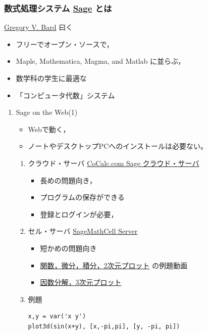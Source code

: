 \documentclass[dvipdfmx,11pat]{jarticle}
\begin{document}
\subsubsection{数式処理システム \href{http://www.sagemath.org}{Sage} とは}
\label{sec:orgf4ed4fb}
\href{http://www.gregorybard.com/Sage.html}{Gregory V. Bard} 曰く
\begin{itemize}
\item フリーでオープン・ソースで，
\item Maple, Mathematica, Magma, and Matlab に並らぶ，
\item 数学科の学生に最適な
\item 「コンピュータ代数」システム
\end{itemize}
\begin{enumerate}
\item Sage on the Web(1)
\label{sec:org4736839}
\begin{itemize}
\item Webで動く，
\item ノートやデスクトップPCへのインストールは必要ない。
\end{itemize}
\begin{enumerate}
\item クラウド・サーバ
\label{sec:orgfed64a7}
\href{http://www.cocalc.com/}{CoCalc.com Sage クラウド・サーバ} 
\begin{itemize}
\item 長めの問題向き，
\item プログラムの保存ができる
\item 登録とログインが必要，
\end{itemize}
\item セル・サーバ
\label{sec:org68e97bd}
\href{http://sagecell.sagemath.org/}{SageMathCell Server}
\begin{itemize}
\item 短かめの問題向き
\item \href{http://www.gregorybard.com/videos/Sage\_part1.swf}{関数，微分，積分，2次元プロット} の例題動画
\item \href{http://www.gregorybard.com/videos/Sage\_part2.swf}{因数分解，3次元プロット}
\end{itemize}
\item 例題
\label{sec:org43e40f8}
\begin{verbatim}
x,y = var('x y')
plot3d(sin(x+y), [x,-pi,pi], [y, -pi, pi])
\end{verbatim}


\end{enumerate}
\end{enumerate}
\end{document}

